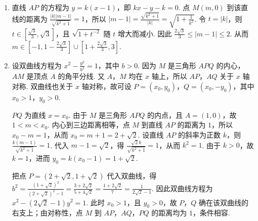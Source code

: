\begin{solution}
\begin{enumerate}
\item 直线 \(AP\) 的方程为 \(y=k(x-1)\)，即 \(kx-y-k=0\). 点 \(M(m,0)\) 到该直线的距离为
\(\frac{|k||m-1|}{\sqrt{k^2+1}}=1\)，所以
\(|m-1|=\frac{\sqrt{k^2+1}}{|k|}=\sqrt{1+\frac{1}{k^2}}\).
令 \(t=|k|\)，则 \(t\in\left[\frac{\sqrt{3}}{3},\sqrt{3}\right]\)，且 \(\sqrt{1+t^{-2}}\) 随 \(t\) 增大而减小. 因此
\(\frac{2\sqrt{3}}{3}\leqslant|m-1|\leqslant2\). 从而
\(m\in\left[-1,1-\frac{2\sqrt{3}}{3}\right]\cup\left[1+\frac{2\sqrt{3}}{3},3\right]\).
\item 设双曲线方程为 \(x^2-\frac{y^2}{b^2}=1\)，其中 \(b>0\). 因为 \(M\) 是三角形 \(APQ\) 的内心，\(AM\) 是顶点 \(A\) 的角平分线. 又 \(A\)，\(M\) 均在 \(x\) 轴上，所以 \(AP\)，\(AQ\) 关于 \(x\) 轴对称. 双曲线也关于 \(x\) 轴对称，故可设
\(P=(x_0,y_0)\)，\(Q=(x_0,-y_0)\)，其中 \(x_0>1\)，\(y_0>0\).

\(PQ\) 为直线 \(x=x_0\). 由于 \(M\) 是三角形 \(APQ\) 的内点，且 \(A=(1,0)\)，故 \(1<m<x_0\). 内心到三边距离相等，点 \(M\) 到直线 \(AP\) 的距离为 \(1\)，所以 \(x_0-m=1\)，从而 \(x_0=m+1=2+\sqrt{2}\). 设直线 \(AP\) 的斜率为正数 \(k\)，则
\(\frac{k(m-1)}{\sqrt{k^2+1}}=1\). 代入 \(m-1=\sqrt{2}\)，得 \(\frac{\sqrt{2}k}{\sqrt{k^2+1}}=1\)，从而 \(k^2=1\). 由于 \(k>0\)，故 \(k=1\)，进而 \(y_0=k(x_0-1)=1+\sqrt{2}\).

把点 \(P=(2+\sqrt{2},1+\sqrt{2})\) 代入双曲线，得
\(b^2=\frac{(1+\sqrt{2})^2}{(2+\sqrt{2})^2-1}=\frac{3+2\sqrt{2}}{5+4\sqrt{2}}=\frac{1+2\sqrt{2}}{7}=\frac{1}{2\sqrt{2}-1}\). 因此双曲线方程为
\(x^2-(2\sqrt{2}-1)y^2=1\). 此时 \(x_0>1\)，且 \(y_0>0\)，故 \(P\)，\(Q\) 确在该双曲线的右支上；由对称性，点 \(M\) 到 \(AP\)，\(AQ\)，\(PQ\) 的距离均为 \(1\)，条件相容.
\end{enumerate}
\end{solution}
